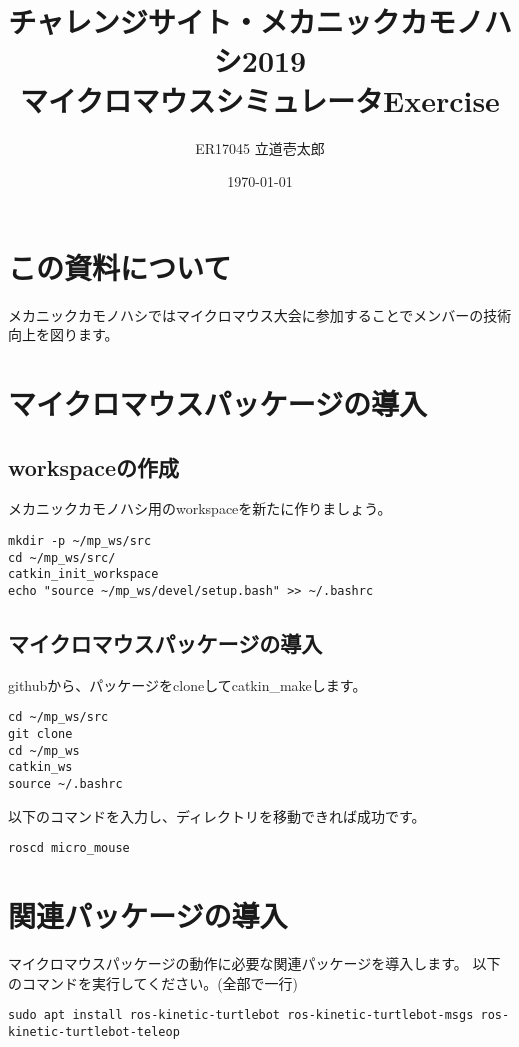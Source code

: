 \documentclass[11pt,a4paper]{jsarticle}
\title{チャレンジサイト・メカニックカモノハシ2019\\マイクロマウスシミュレータExercise}
\author{ER17045 立道壱太郎}
\date{\today}
\begin{document}
\maketitle
%
%
\section{この資料について}
メカニックカモノハシではマイクロマウス大会に参加することでメンバーの技術向上を図ります。


\section{マイクロマウスパッケージの導入}

\subsection{workspaceの作成}
メカニックカモノハシ用のworkspaceを新たに作りましょう。

\begin{lstlisting}[frame=single, caption=workspaceの作成, label=create_workspace]
mkdir -p ~/mp_ws/src
cd ~/mp_ws/src/
catkin_init_workspace
echo "source ~/mp_ws/devel/setup.bash" >> ~/.bashrc
\end{lstlisting}


\subsection{マイクロマウスパッケージの導入}
githubから、パッケージをcloneしてcatkin\_makeします。
\begin{lstlisting}[frame=single, caption=catkin\_make, label=catkin_make]
cd ~/mp_ws/src
git clone 
cd ~/mp_ws
catkin_ws
source ~/.bashrc
\end{lstlisting}

以下のコマンドを入力し、ディレクトリを移動できれば成功です。
\begin{lstlisting}[frame=single, caption=roscd, label=roscd]
roscd micro_mouse
\end{lstlisting}




\newpage

\section{関連パッケージの導入}
マイクロマウスパッケージの動作に必要な関連パッケージを導入します。
以下のコマンドを実行してください。(全部で一行)
\begin{lstlisting}[frame=single, caption=roscd, label=roscd]
sudo apt install ros-kinetic-turtlebot ros-kinetic-turtlebot-msgs ros-kinetic-turtlebot-teleop 
\end{lstlisting}
\end{document}
